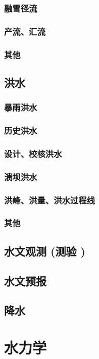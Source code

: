 \documentclass[UTF8]{../../ApplicationUniverse}
\begin{document}
        \subsubsection{融雪径流}
        \subsubsection{产流、汇流}
        \subsubsection{其他}
    \subsection{洪水}
        \subsubsection{暴雨洪水}
        \subsubsection{历史洪水}
        \subsubsection{设计、校核洪水}
        \subsubsection{溃坝洪水}
        \subsubsection{洪峰、洪量、洪水过程线}
        \subsubsection{其他}
    \subsection{水文观测 (测验 )}
    \subsection{水文预报}
    \subsection{降水}
\section{水力学}
\end{document}
